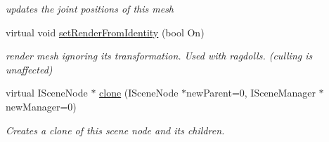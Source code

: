\begin{DoxyCompactItemize}
\begin{DoxyCompactList}\small\item\em updates the joint positions of this mesh \end{DoxyCompactList}\item 
\hypertarget{classirr_1_1scene_1_1_c_animated_mesh_scene_node_ab9ed87fa09ed2eb10c6f889dc4e95458}{virtual void \hyperlink{classirr_1_1scene_1_1_c_animated_mesh_scene_node_ab9ed87fa09ed2eb10c6f889dc4e95458}{set\-Render\-From\-Identity} (bool On)}\label{classirr_1_1scene_1_1_c_animated_mesh_scene_node_ab9ed87fa09ed2eb10c6f889dc4e95458}

\begin{DoxyCompactList}\small\item\em render mesh ignoring its transformation. Used with ragdolls. (culling is unaffected) \end{DoxyCompactList}\item 
virtual I\-Scene\-Node $\ast$ \hyperlink{classirr_1_1scene_1_1_c_animated_mesh_scene_node_a94c00f5fe72383465567410e6b87d736}{clone} (I\-Scene\-Node $\ast$new\-Parent=0, I\-Scene\-Manager $\ast$new\-Manager=0)
\begin{DoxyCompactList}\small\item\em Creates a clone of this scene node and its children. \end{DoxyCompactList}\end{DoxyCompactItemize}


